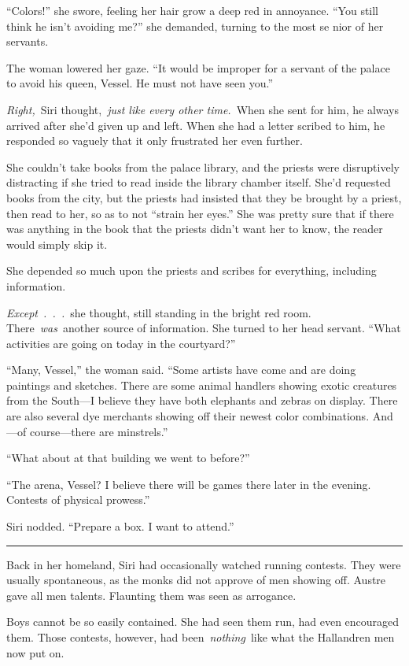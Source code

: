 “Colors!” she swore, feeling her hair grow a deep red in annoyance. “You still think he isn’t avoiding me?” she demanded, turning to the most se nior of her servants.

The woman lowered her gaze. “It would be improper for a servant of the palace to avoid his queen, Vessel. He must not have seen you.”

\textit{Right,}~Siri thought,~\textit{just like every other time.}~When she sent for him, he always arrived after she’d given up and left. When she had a letter scribed to him, he responded so vaguely that it only frustrated her even further.

She couldn’t take books from the palace library, and the priests were disruptively distracting if she tried to read inside the library chamber itself. She’d requested books from the city, but the priests had insisted that they be brought by a priest, then read to her, so as to not “strain her eyes.” She was pretty sure that if there was anything in the book that the priests didn’t want her to know, the reader would simply skip it.

She depended so much upon the priests and scribes for everything, including information.

\textit{Except~.~.~.}~she thought, still standing in the bright red room. There~\textit{was}~another source of information. She turned to her head servant. “What activities are going on today in the courtyard?”

“Many, Vessel,” the woman said. “Some artists have come and are doing paintings and sketches. There are some animal handlers showing exotic creatures from the South—I believe they have both elephants and zebras on display. There are also several dye merchants showing off their newest color combinations. And—of course—there are minstrels.”

“What about at that building we went to before?”

“The arena, Vessel? I believe there will be games there later in the evening. Contests of physical prowess.”

Siri nodded. “Prepare a box. I want to attend.”

\bigskip \hrule \bigskip

Back in her homeland, Siri had occasionally watched running contests. They were usually spontaneous, as the monks did not approve of men showing off. Austre gave all men talents. Flaunting them was seen as arrogance.

Boys cannot be so easily contained. She had seen them run, had even encouraged them. Those contests, however, had been~\textit{nothing}~like what the Hallandren men now put on.


